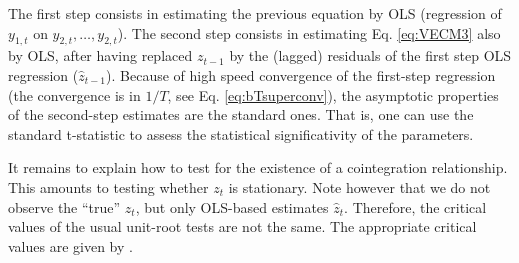 \documentclass[
  12pt,
]{book}
\theoremstyle{definition}
\theoremstyle{definition}
\theoremstyle{definition}
\theoremstyle{definition}
\theoremstyle{remark}
\begin{document}
The first step consists in estimating the previous equation by OLS (regression of \(y_{1,t}\) on \(y_{2,t},\dots,y_{2,t}\)). The second step consists in estimating Eq. \eqref{eq:VECM3} also by OLS, after having replaced \(z_{t-1}\) by the (lagged) residuals of the first step OLS regression (\(\hat{z}_{t-1}\)). Because of high speed convergence of the first-step regression (the convergence is in \(1/T\), see Eq. \eqref{eq:bTsuperconv}), the asymptotic properties of the second-step estimates are the standard ones. That is, one can use the standard t-statistic to assess the statistical significativity of the parameters.

It remains to explain how to test for the existence of a cointegration relationship. This amounts to testing whether \(z_t\) is stationary. Note however that we do not observe the ``true'' \(z_t\), but only OLS-based estimates \(\hat{z}_t\). Therefore, the critical values of the usual unit-root tests are not the same. The appropriate critical values are given by \citet{Phillips_Ouliaris_1990}.
\end{document}
